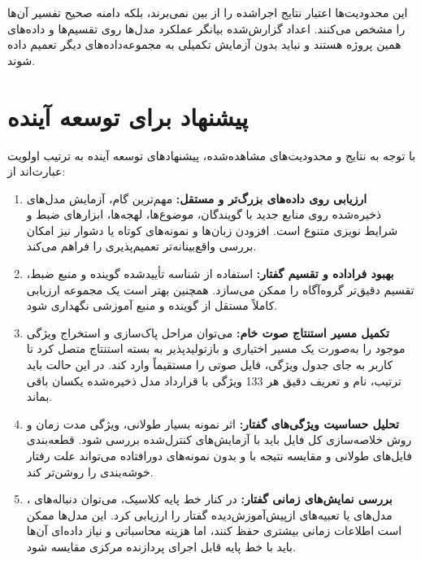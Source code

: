 این محدودیت‌ها اعتبار نتایج اجراشده را از بین نمی‌برند، بلکه دامنه صحیح تفسیر آن‌ها را مشخص می‌کنند. اعداد گزارش‌شده بیانگر عملکرد مدل‌ها روی تقسیم‌ها و داده‌های همین پروژه هستند و نباید بدون آزمایش تکمیلی به مجموعه‌داده‌های دیگر تعمیم داده شوند.


\section{پیشنهاد برای توسعه آینده}

با توجه به نتایج و محدودیت‌های مشاهده‌شده، پیشنهادهای توسعه آینده به ترتیب اولویت عبارت‌اند از:

\begin{enumerate}
	\item \textbf{ارزیابی روی داده‌های بزرگ‌تر و مستقل:}
	مهم‌ترین گام، آزمایش مدل‌های ذخیره‌شده روی منابع جدید با گویندگان، موضوع‌ها، لهجه‌ها، ابزارهای ضبط و شرایط نویزی متنوع است. افزودن زبان‌ها و نمونه‌های کوتاه یا دشوار نیز امکان بررسی واقع‌بینانه‌تر تعمیم‌پذیری را فراهم می‌کند.

	\item \textbf{بهبود فراداده و تقسیم گفتار:}
	استفاده از شناسه تأییدشده گوینده و منبع ضبط، تقسیم دقیق‌تر گروه‌آگاه را ممکن می‌سازد. همچنین بهتر است یک مجموعه ارزیابی کاملاً مستقل از گوینده و منبع آموزشی نگهداری شود.

	\item \textbf{تکمیل مسیر استنتاج صوت خام:}
	می‌توان مراحل پاک‌سازی و استخراج ویژگی موجود را به‌صورت یک مسیر اختیاری و بازتولیدپذیر به بسته استنتاج متصل کرد تا کاربر به جای جدول ویژگی، فایل صوتی را مستقیماً وارد کند. در این حالت باید ترتیب، نام و تعریف دقیق هر 133 ویژگی با قرارداد مدل ذخیره‌شده یکسان باقی بماند.

	\item \textbf{تحلیل حساسیت ویژگی‌های گفتار:}
	اثر نمونه بسیار طولانی، ویژگی مدت زمان و روش خلاصه‌سازی کل فایل باید با آزمایش‌های کنترل‌شده بررسی شود. قطعه‌بندی فایل‌های طولانی و مقایسه نتیجه با و بدون نمونه‌های دورافتاده می‌تواند علت رفتار خوشه‌بندی را روشن‌تر کند.

	\item \textbf{بررسی نمایش‌های زمانی گفتار:}
	در کنار خط پایه کلاسیک، می‌توان دنباله‌های
	،
	مدل‌های
	یا تعبیه‌های ازپیش‌آموزش‌دیده گفتار را ارزیابی کرد. این مدل‌ها ممکن است اطلاعات زمانی بیشتری حفظ کنند، اما هزینه محاسباتی و نیاز داده‌ای آن‌ها باید با خط پایه قابل اجرای پردازنده مرکزی مقایسه شود.


\end{enumerate}

